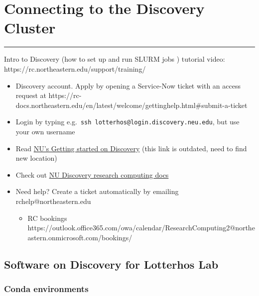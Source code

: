 \documentclass[
  letterpaper,
  DIV=11,
  numbers=noendperiod]{scrreprt}
\providecommand{\tightlist}{%
  \setlength{\itemsep}{0pt}\setlength{\parskip}{0pt}}\usepackage{longtable,booktabs,array}
\begin{document}
\hypertarget{connecting-to-the-discovery-cluster}{%
\chapter{Connecting to the Discovery
Cluster}\label{connecting-to-the-discovery-cluster}}

\begin{center}\rule{0.5\linewidth}{0.5pt}\end{center}

Intro to Discovery (how to set up and run SLURM jobs ) tutorial video:
https://rc.northeastern.edu/support/training/

\begin{itemize}
\item
  Discovery account. Apply by opening a Service-Now ticket with an
  access request at
  https://rc-docs.northeastern.edu/en/latest/welcome/gettinghelp.html\#submit-a-ticket
\item
  Login by typing e.g.~\texttt{ssh\ lotterhos@login.discovery.neu.edu},
  but use your own username
\item
  Read
  \href{https://cpb-us-w2.wpmucdn.com/express.northeastern.edu/dist/1/43/files/2019/08/GettingStartedGuide-1.pdf}{NU's
  Getting started on Discovery} (this link is outdated, need to find new
  location)
\item
  Check out \href{https://rc-docs.northeastern.edu/en/latest/}{NU
  Discovery research computing docs}
\item
  Need help? Create a ticket automatically by emailing
  rchelp@northeastern.edu

  \begin{itemize}
  \tightlist
  \item
    RC bookings
    https://outlook.office365.com/owa/calendar/ResearchComputing2@northeastern.onmicrosoft.com/bookings/
  \end{itemize}
\end{itemize}

\hypertarget{software-on-discovery-for-lotterhos-lab}{%
\section*{\texorpdfstring{\textbf{Software on Discovery for Lotterhos
Lab}}{Software on Discovery for Lotterhos Lab}}\label{software-on-discovery-for-lotterhos-lab}}

\hypertarget{conda-environments}{%
\subsection*{\texorpdfstring{\textbf{Conda
environments}}{Conda environments}}\label{conda-environments}}
\end{document}
